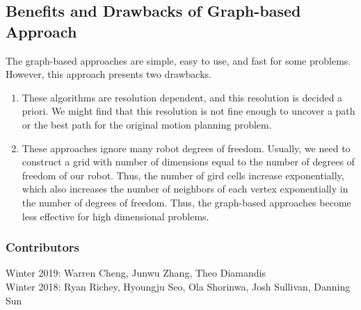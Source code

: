\documentclass[twoside]{article}
\begin{document}
\subsection{Benefits and Drawbacks of Graph-based Approach}
The graph-based approaches are simple, easy to use, and fast for some problems. However, this approach presents two drawbacks.
\begin{enumerate}
\item These algorithms are resolution dependent, and this resolution is decided a priori. We might find that this resolution is not fine enough to uncover a path or the best path for the original motion planning problem. 
\item These approaches ignore many robot degrees of freedom. Usually, we need to construct a grid with number of dimensions equal to the number of degrees of freedom of our robot. Thus, the number of gird cells increase exponentially, which also increases the number of neighbors of each vertex exponentially in the number of degrees of freedom. Thus, the graph-based approaches become less effective for high dimensional problems.

\end{enumerate}


\printbibliography

\subsubsection*{Contributors}
Winter 2019: Warren Cheng,  Junwu Zhang, Theo Diamandis\\
Winter 2018: Ryan Richey, Hyoungju Seo, Ola Shorinwa, Josh Sullivan, Danning Sun
\end{document}
